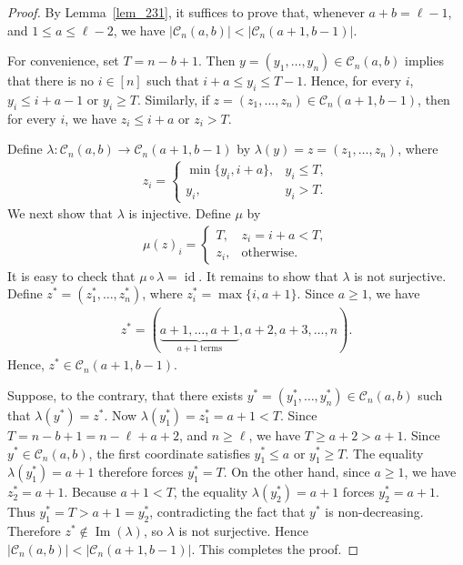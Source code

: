 \documentclass[11pt]{article}
\begin{document}
\begin{proof}
By Lemma~\ref{lem_231}, it suffices to prove that, whenever $a+b=\ell-1$, and $1\le a\le \ell-2$,
we have
$|\mathcal C_n(a,b)|
<
|\mathcal C_n(a+1,b-1)|$.

For convenience, set $T=n-b+1$. Then $y=(y_1,\ldots,y_n)\in\mathcal C_n(a,b)$ 
implies that there is no $i\in[n]$ such that $i+a\le y_i\le T-1$.
Hence, for every $i$, $y_i\le i+a-1$ or $y_i\ge T$.
Similarly, if $z=(z_1,\ldots,z_n)\in\mathcal C_n(a+1,b-1)$,
then for every $i$, we have $z_i\le i+a$ or $z_i>T$.

Define $\lambda:\mathcal C_n(a,b)\longrightarrow
\mathcal C_n(a+1,b-1)$
by $\lambda(y)=z=(z_1,\ldots,z_n)$, where
\begin{align*}
z_i=
\begin{cases}
\min\{y_i,i+a\}, & y_i\le T,\\
y_i, & y_i>T.
\end{cases}
\end{align*}
We next show that $\lambda$ is injective. Define $\mu$ by
\begin{align*}
\mu(z)_i=
\begin{cases}
T, & z_i=i+a<T,\\
z_i, & \text{otherwise}.
\end{cases}
\end{align*}
It is easy to check that $\mu\circ\lambda=\operatorname{id}$.
It remains to show that $\lambda$ is not surjective. Define
$z^*=(z_1^*,\ldots,z_n^*)$, where
$z_i^*=\max\{i,a+1\}$. Since $a\geq1$, we have
\begin{align*}
z^*=(\underbrace{a+1,\ldots,a+1}_{a+1\text{ terms}},a+2,a+3,\ldots,n).
\end{align*}
Hence, $z^*\in\mathcal C_n(a+1,b-1)$.

Suppose, to the contrary, that there exists
$y^*=(y_1^*,\ldots,y_n^*)\in\mathcal C_n(a,b)$ such that $\lambda(y^*)=z^*$.
Now $\lambda(y^*_1)=z_1^*=a+1<T$.
Since $T=n-b+1=n-\ell+a+2$, and $n\ge\ell$, we have $T\ge a+2>a+1$.
Since \(y^*\in\mathcal C_n(a,b)\), the first coordinate satisfies
$y_1^*\le a$ or $y_1^*\ge T$.
The equality \(\lambda(y^*_1)=a+1\) therefore forces $y_1^*=T$.
On the other hand, since $a\ge1$, we have $z_2^*=a+1$.
Because $a+1<T$, the equality $\lambda(y^*_2)=a+1$
forces $y_2^*=a+1$.
Thus $y_1^*=T>a+1=y_2^*$,
contradicting the fact that $y^*$ is non-decreasing.
Therefore $z^*\notin\operatorname{Im}(\lambda)$, so
$\lambda$ is not surjective. Hence
$|\mathcal C_n(a,b)|
<
|\mathcal C_n(a+1,b-1)|$.
This completes the proof.
\end{proof}
\end{document}
